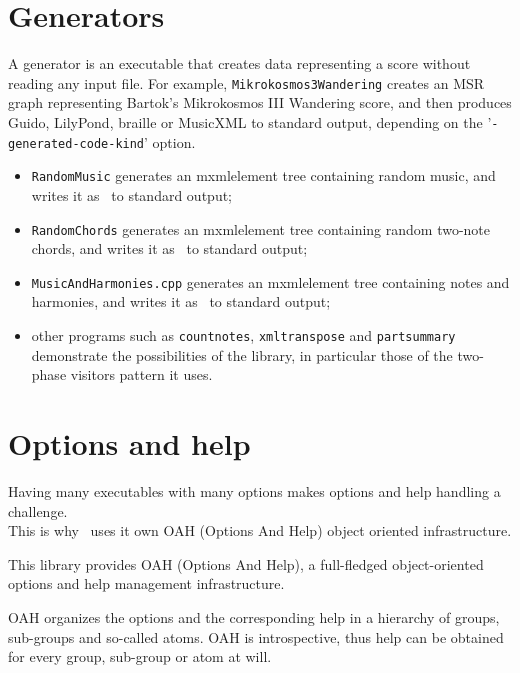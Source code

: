 \documentclass[12pt,a4paper]{article}
\begin{document}
\section{Generators}

A generator is an executable that creates data representing a score without reading any input file.
For example, {\tt Mikrokosmos3Wandering} creates an MSR graph representing Bartok's Mikrokosmos III Wandering score, and then produces Guido, LilyPond, braille or MusicXML to standard output, depending on the '{\tt -generated-code-kind}' option.

\begin{itemize}
\item \texttt{RandomMusic} generates an mxmlelement tree containing random music, and writes it as \mxml\ to standard output;

\item \texttt{RandomChords} generates an mxmlelement tree containing random two-note chords, and writes it as \mxml\ to standard output;

\item \texttt{MusicAndHarmonies.cpp} generates an mxmlelement tree containing notes and harmonies, and writes it as \mxml\ to standard output;

\item other programs such as {\tt countnotes}, {\tt xmltranspose} and {\tt partsummary} demonstrate the possibilities of the library, in particular those of the two-phase visitors pattern it uses.
\end{itemize}


\section{Options and help}

Having many executables with many options makes options and help handling a challenge.\\
This is why \lib\ uses it own OAH (Options And Help) object oriented infrastructure.

This library provides OAH (Options And Help), a full-fledged object-oriented options and help management infrastructure.

OAH organizes the options and the corresponding help in a hierarchy of groups, sub-groups and so-called atoms. OAH is introspective, thus help can be obtained for every group, sub-group or atom at will.
\end{document}
